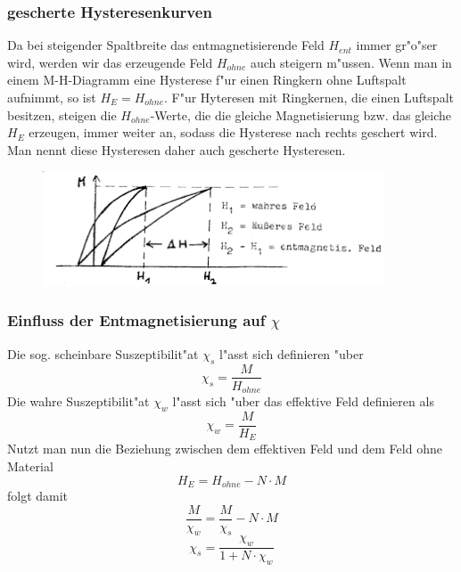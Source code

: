         \subsubsection*{gescherte Hysteresenkurven}
            Da bei steigender Spaltbreite das entmagnetisierende Feld $H_{ent}$ immer gr"o"ser wird, werden wir das erzeugende Feld $H_{ohne}$
            auch steigern m"ussen. Wenn man in einem M-H-Diagramm eine Hysterese f"ur einen Ringkern
            ohne Luftspalt aufnimmt, so ist $H_{E}=H_{ohne}$. F"ur Hyteresen mit Ringkernen,
            die einen Luftspalt besitzen, steigen die $H_{ohne}$-Werte, die die gleiche Magnetisierung
            bzw. das gleiche $H_{E}$ erzeugen, immer weiter an, sodass die Hysterese nach rechts
            geschert wird. Man nennt diese Hysteresen daher auch gescherte Hysteresen.
            \begin{figure}
                \centering
                \includegraphics[width=0.9\textwidth]{Images/geschert.png}
            \end{figure}

        \subsubsection*{Einfluss der Entmagnetisierung auf $\chi$}
            Die sog. scheinbare Suszeptibilit"at $\chi_s$ l"asst sich definieren "uber
            \begin{equation}
                \chi_s = \frac{M}{H_{ohne}}
            \end{equation}
            Die wahre Suszeptibilit"at $\chi_w$ l"asst sich "uber das effektive Feld definieren als
            \begin{equation}
                \chi_w = \frac{M}{H_{E}}
            \end{equation}
            Nutzt man nun die Beziehung zwischen dem effektiven Feld und dem Feld ohne Material
            \begin{equation}
                H_E = H_{ohne} - N\cdot M
            \end{equation}
            folgt damit
            \begin{equation}
                \frac{M}{\chi_w} = \frac{M}{\chi_s} - N \cdot M
            \end{equation}
            \begin{equation}
                \chi_s = \frac{\chi_w}{1+N\cdot \chi_w}
            \end{equation}
